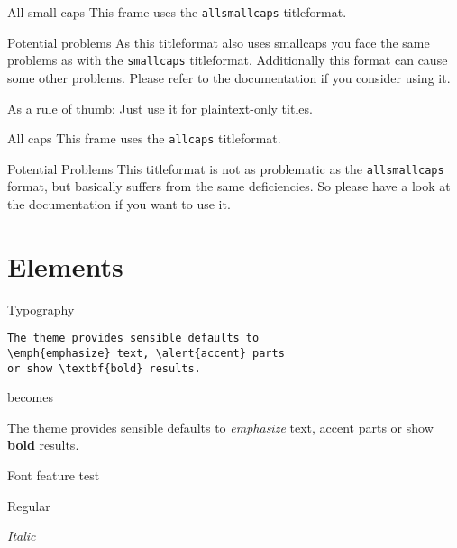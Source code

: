 \documentclass[10pt]{beamer}
\begin{document}
{
\begin{frame}{All small caps}
	This frame uses the \texttt{allsmallcaps} titleformat.

	\begin{alertblock}{Potential problems}
		As this titleformat also uses smallcaps you face the same problems as with the \texttt{smallcaps} titleformat. Additionally this format can cause some other problems. Please refer to the documentation if you consider using it.

		As a rule of thumb: Just use it for plaintext-only titles.
	\end{alertblock}
\end{frame}
}

{
\begin{frame}{All caps}
	This frame uses the \texttt{allcaps} titleformat.

	\begin{alertblock}{Potential Problems}
		This titleformat is not as problematic as the \texttt{allsmallcaps} format, but basically suffers from the same deficiencies. So please have a look at the documentation if you want to use it.
	\end{alertblock}
\end{frame}
}

\section{Elements}

\begin{frame}[fragile]{Typography}
      \begin{verbatim}The theme provides sensible defaults to
\emph{emphasize} text, \alert{accent} parts
or show \textbf{bold} results.\end{verbatim}

  \begin{center}becomes\end{center}

  The theme provides sensible defaults to \emph{emphasize} text,
  \alert{accent} parts or show \textbf{bold} results.
\end{frame}

\begin{frame}{Font feature test}
  \begin{description} [<+->]
    \item Regular
    \item \textit{Italic} 
  \end{description}
\end{frame}
\end{document}
